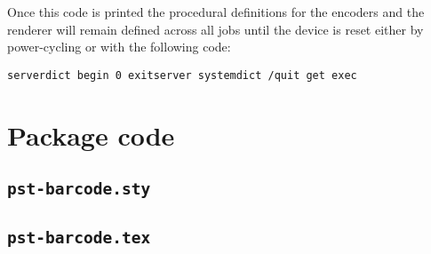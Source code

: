 \documentclass{article}
\begin{document}
Once this code is printed the procedural definitions for the encoders and
the renderer will remain defined across all jobs until the device is reset
either by power-cycling or with the following code:

\begin{lstlisting}
serverdict begin 0 exitserver systemdict /quit get exec
\end{lstlisting}






\clearpage
\section{Package code}
\subsection{\texttt{pst-barcode.sty}}



\subsection{\texttt{pst-barcode.tex}}


%
\end{document}
